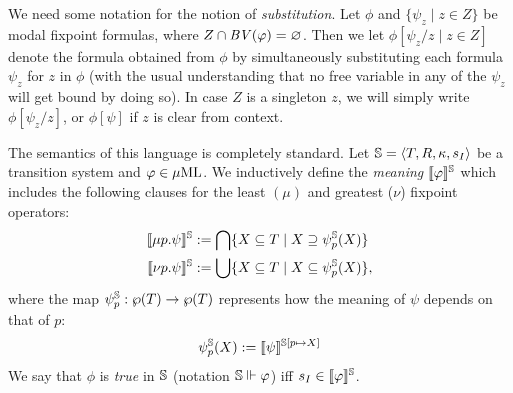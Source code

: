 We need some notation for the notion of \emph{substitution}.
Let $\phi$ and $\{ \psi_{z} \mid z \in Z \}$ be modal fixpoint formulas, where
$Z \cap \mathit{BV}{(\varphi)} = \varnothing$.
Then we let $\phi[\psi_{z}/z \mid z \in Z]$
denote the formula obtained from $\phi$ by simultaneously substituting each
formula $\psi_{z}$ for $z$ in $\phi$ (with the usual understanding that no 
free variable in any of the $\psi_{z}$ will get bound by doing so).
In case $Z$ is a singleton $z$, we will simply write $\phi[\psi_{z}/z]$, or 
$\phi[\psi]$ if $z$ is clear from context.
\smallskip

The semantics of this language is completely standard. 
Let $\mathbb{S} = \langle{T,R,\kappa, s_I}\rangle$ be a transition system and $\varphi \in 
\mu\mathrm{ML}$. 
We inductively define the \emph{meaning} $\llbracket\varphi\rrbracket^{\mathbb{S}}$ which includes
the following clauses for the least $(\mu)$ and greatest ($\nu$) fixpoint 
operators:
%
\begin{align*}
   \llbracket\mu p.\psi\rrbracket^{\mathbb{S}}  & \mathrel{:=}  
    \bigcap \{X \subseteq T \mid X \supseteq \psi^{\mathbb{S}}_{p}(X) \}
\\ \llbracket\nu p.\psi\rrbracket^{\mathbb{S}}  & \mathrel{:=}  
    \bigcup \{X \subseteq T \mid X \subseteq \psi^{\mathbb{S}}_{p}(X) \},
\end{align*}
where the map $\psi^{\mathbb{S}}_{p}: \wp(T) \to \wp(T)$ represents how the meaning
of $\psi$ depends on that of $p$:
\[
\psi^{\mathbb{S}}_{p}(X) \mathrel{:=} \llbracket\psi\rrbracket^{\mathbb{S}[p\mapsto X]}
\]
%
We say that $\phi$ is \emph{true} in $\mathbb{S}$ (notation $\mathbb{S} \Vdash \varphi$) iff $s_I \in \llbracket\varphi\rrbracket^{\mathbb{S}}$.%

